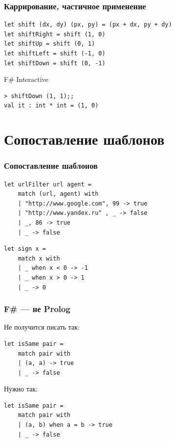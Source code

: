 \documentclass[xetex,mathserif,serif]{beamer}
\begin{document}
	\begin{frame}[fragile]
		\frametitle{Каррирование, частичное применение}
		\begin{verbatim}
let shift (dx, dy) (px, py) = (px + dx, py + dy)
let shiftRight = shift (1, 0)
let shiftUp = shift (0, 1)
let shiftLeft = shift (-1, 0)
let shiftDown = shift (0, -1)
		\end{verbatim}
		\begin{alertblock}{F\# Interactive}
			\begin{verbatim}
> shiftDown (1, 1);;
val it : int * int = (1, 0)
			\end{verbatim}
		\end{alertblock}
\end{frame}

	\section{Сопоставление шаблонов}
	
	\begin{frame}[fragile]
		\frametitle{Сопоставление шаблонов}
		\begin{verbatim}
let urlFilter url agent =
    match (url, agent) with
    | "http://www.google.com", 99 -> true
    | "http://www.yandex.ru" , _ -> false
    | _, 86 -> true
    | _ -> false
		\end{verbatim}

		\begin{verbatim}
let sign x =
    match x with
    | _ when x < 0 -> -1
    | _ when x > 0 -> 1
    | _ -> 0
		\end{verbatim}
\end{frame}

	\begin{frame}[fragile]
		\frametitle{F\# --- не Prolog}
		Не получится писать так:
		\begin{verbatim}
let isSame pair =
    match pair with
    | (a, a) -> true
    | _ -> false
		\end{verbatim}
		Нужно так:
		\begin{verbatim}
let isSame pair =
    match pair with
    | (a, b) when a = b -> true
    | _ -> false
		\end{verbatim}
\end{frame}
\end{document}
